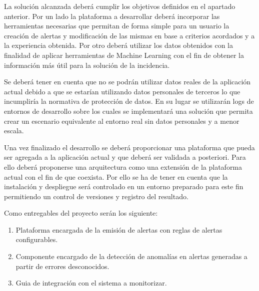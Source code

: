 La solución alcanzada deberá cumplir los objetivos definidos en el apartado anterior. Por un lado la plataforma a desarrollar deberá incorporar las herramientas necesarias que permitan de forma simple para un usuario la creación de alertas y modificación de las mismas en base a criterios acordados y a la experiencia obtenida. Por otro deberá utilizar los datos obtenidos con la finalidad de aplicar herramientas de Machine Learning con el fin de obtener la información más útil para la solución de la incidencia.

Se deberá tener en cuenta que no se podrán utilizar datos reales de la aplicación actual debido a que se estarían utilizando datos personales de terceros lo que incumpliría la normativa de protección de datos. En su lugar se utilizarán logs de entornos de desarrollo sobre los cuales se implementará una solución que permita crear un escenario equivalente al entorno real sin datos personales y a menor escala.

Una vez finalizado el desarrollo se deberá proporcionar una plataforma que pueda ser agregada a la aplicación actual y que deberá ser validada a posteriori. Para ello deberá proponerse una arquitectura como una extensión de la plataforma actual con el fin de que coexista. Por ello se ha de tener en cuenta que la instalación y despliegue será controlado en un entorno preparado para este fin permitiendo un control de versiones y registro del resultado.

Como entregables del proyecto serán los siguiente:

\begin{enumerate}
\item Plataforma encargada de la emisión de alertas con reglas de alertas configurables.
\item Componente encargado de la detección de anomalías en alertas generadas a partir de errores desconocidos.
\item Guia de integración con el sistema a monitorizar.
\end{enumerate}